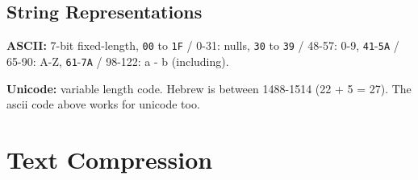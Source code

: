 \documentclass[]{article}
\newcommand\ttt   {\texttt}
\newcommand\fortitle[1] {\Large #1 \normalsize}
\begin{document}
\begin{multicols}{2}
		\subsection{String Representations}
		\textbf{ASCII: }7-bit fixed-length, \ttt{00} to \ttt{1F} / 0-31: nulls, \texttt{30} to \texttt{39} / 48-57: 0-9, \texttt{41}-\texttt{5A} / 65-90: A-Z, \texttt{61}-\texttt{7A} / 98-122: a - b (including). 
		
		\textbf{Unicode: }variable length code. Hebrew is between 1488-1514 (22 + 5 = 27). The ascii code above works for unicode too. 
		
	\end{multicols}
	
	\pagebreak
	\section{\fortitle{Text Compression}}
\end{document}
